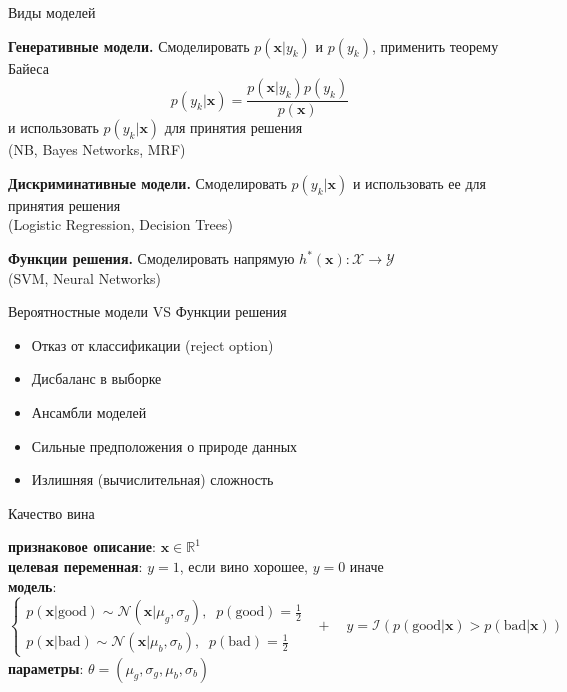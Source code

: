 \documentclass[aspectratio=169]{beamer}
\begin{document}
\begin{frame}{Виды моделей}

{\bf Генеративные модели.} Смоделировать $p(\mathbf{x} | y_k)$ и $p(y_k)$, применить теорему Байеса
\[
p(y_k | \mathbf{x}) = \frac{p(\mathbf{x} | y_k) p(y_k)}{p(\mathbf{x})}
\]
и использовать $p(y_k | \mathbf{x})$ для принятия решения \\ (NB, Bayes Networks, MRF)
\vspace{1em}

{\bf Дискриминативные модели.} Смоделировать $p(y_k | \mathbf{x})$ и использовать ее для принятия решения \\ (Logistic Regression, Decision Trees)
\vspace{1em}

{\bf Функции решения.} Смоделировать напрямую $h^*(\mathbf{x}): \mathcal{X} \rightarrow \mathcal{Y}$ \\ (SVM, Neural Networks)

\end{frame}

\begin{frame}{Вероятностные модели VS Функции решения}

\begin{itemize}
\item[\color{green}\ding{108}] Отказ от классификации (reject option)
\item[\color{green}\ding{108}] Дисбаланс в выборке
\item[\color{green}\ding{108}] Ансамбли моделей
\item[\color{red}\ding{108}] Сильные предположения о природе данных
\item[\color{red}\ding{108}] Излишняя (вычислительная) сложность
\end{itemize}

\end{frame}

\begin{frame}{Качество вина}

{\bf признаковое описание}: $\mathbf{x} \in \mathbb{R}^1$ \\
\vspace{1em}
{\bf целевая переменная}: $y = 1$, если вино хорошее, $y = 0$ иначе \\
\vspace{1em}
{\bf модель}:
\[
\begin{cases}
p(\mathbf{x} | \text{good}) \sim \mathcal{N}(\mathbf{x} | \mu_g, \sigma_g), \;\; p(\text{good}) = \frac 1 2 \\
p(\mathbf{x} |  \text{bad}) \sim \mathcal{N}(\mathbf{x} | \mu_b, \sigma_b), \;\; p( \text{bad}) = \frac 1 2
\end{cases} \;\; + \quad y = \mathcal{I}(p(\text{good} | \mathbf{x}) > p(\text{bad} | \mathbf{x}))
\]
\vspace{1em}
{\bf параметры}: $\theta = (\mu_g, \sigma_g, \mu_b, \sigma_b)$

\end{frame}
\end{document}
